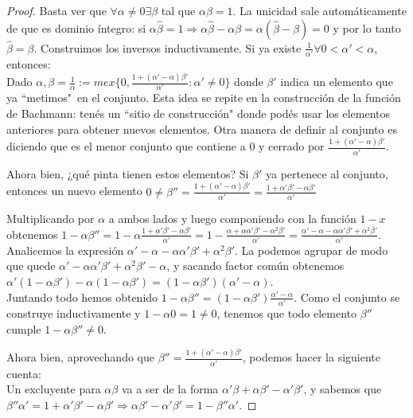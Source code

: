 \documentclass[10pt,a4paper,final]{report}
\def\key#1{\{#1\}}
\begin{document}
\begin{proof}
	Basta ver que $\forall\alpha\neq0 \exists \beta$ tal que $\alpha\beta = 1$. La unicidad sale automáticamente de que es dominio íntegro: si $\alpha \hat{\beta} = 1 \Rightarrow \alpha\hat{\beta} - \alpha\beta = \alpha (\hat{\beta} - \beta) = 0$ y por lo tanto $\hat{\beta} = \beta$. Construimos los inversos inductivamente. Si ya existe $\frac{1}{\alpha'} \forall 0<\alpha'<\alpha$, entonces: \\
	
	Dado $\alpha, \beta = \frac{1}{\alpha} := mex\key{0,\frac{1+ (\alpha'-\alpha)\beta'}{\alpha'} : \alpha' \neq 0}$ donde $\beta'$ indica un elemento que ya ``metimos"\ en el conjunto. Esta idea se repite en la construcción de la función de Bachmann: tenés un ``sitio de construcción" donde podés usar los elementos anteriores para obtener nuevos elementos. Otra manera de definir al conjunto es diciendo que es el menor conjunto que contiene a $0$ y cerrado por $\frac{1+ (\alpha'-\alpha)\beta'}{\alpha'}$.
	
	Ahora bien, ¿qué pinta tienen estos elementos? Si $\beta'$ ya pertenece al conjunto, entonces un nuevo elemento $0\neq \beta'' = \frac{1+ (\alpha'-\alpha)\beta'}{\alpha'} = \frac{1 + \alpha'\beta' - \alpha \beta'}{\alpha'}$
	
	Multiplicando por $\alpha$ a ambos lados y luego componiendo con la función $1-x$ obtenemos $1 - \alpha \beta'' = 1 - \alpha \frac{1 + \alpha'\beta' - \alpha \beta'}{\alpha'} = 1 - \frac{\alpha + \alpha \alpha'\beta' - \alpha^2 \beta'}{\alpha'} = \frac{\alpha' - \alpha - \alpha \alpha'\beta' + \alpha^2 \beta'}{\alpha'}$. Analicemos la expresión $\alpha' - \alpha - \alpha \alpha'\beta' + \alpha^2 \beta'$. La podemos agrupar de modo que quede $\alpha' - \alpha\alpha'\beta' + \alpha^2\beta' - \alpha$, y sacando factor común obtenemos $\alpha'(1-\alpha\beta') - \alpha(1 - \alpha\beta') = (1-\alpha\beta') ( \alpha'-\alpha)$. \\
	
	Juntando todo hemos obtenido $1-\alpha\beta'' = (1-\alpha\beta') \frac{\alpha'-\alpha}{\alpha'}$. Como el conjunto se construye inductivamente y $1-\alpha0 = 1 \neq 0$, tenemos que todo elemento $\beta''$ cumple $1-\alpha\beta'' \neq 0$.
	
	Ahora bien, aprovechando que $\beta'' = \frac{1+ (\alpha'-\alpha)\beta'}{\alpha'}$, podemos hacer la siguiente cuenta: \\
	
	Un excluyente para $\alpha\beta$ va a ser de la forma $\alpha'\beta+\alpha\beta'-\alpha'\beta'$, y sabemos que $\beta'' \alpha' = 1 + \alpha'\beta' - \alpha\beta' \Rightarrow \alpha\beta'-\alpha'\beta' = 1 - \beta''\alpha'$.
	

\end{proof}
\end{document}
